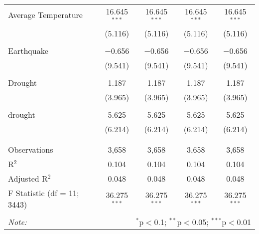 \begin{table}[!htbp]
\begin{tabular}{@{\extracolsep{5pt}}lcccc}
 Average Temperature & 16.645$^{***}$ & 16.645$^{***}$ & 16.645$^{***}$ & 16.645$^{***}$ \\ 
  & (5.116) & (5.116) & (5.116) & (5.116) \\ 
  & & & & \\ 
 Earthquake & $-$0.656 & $-$0.656 & $-$0.656 & $-$0.656 \\ 
  & (9.541) & (9.541) & (9.541) & (9.541) \\ 
  & & & & \\ 
 Drought & 1.187 & 1.187 & 1.187 & 1.187 \\ 
  & (3.965) & (3.965) & (3.965) & (3.965) \\ 
  & & & & \\ 
 drought & 5.625 & 5.625 & 5.625 & 5.625 \\ 
  & (6.214) & (6.214) & (6.214) & (6.214) \\ 
  & & & & \\ 
\hline \\[-1.8ex] 
Observations & 3,658 & 3,658 & 3,658 & 3,658 \\ 
R$^{2}$ & 0.104 & 0.104 & 0.104 & 0.104 \\ 
Adjusted R$^{2}$ & 0.048 & 0.048 & 0.048 & 0.048 \\ 
F Statistic (df = 11; 3443) & 36.275$^{***}$ & 36.275$^{***}$ & 36.275$^{***}$ & 36.275$^{***}$ \\ 
\hline 
\hline \\[-1.8ex] 
\textit{Note:}  & \multicolumn{4}{r}{$^{*}$p$<$0.1; $^{**}$p$<$0.05; $^{***}$p$<$0.01} \\ 
\end{tabular} 
\end{table} 
